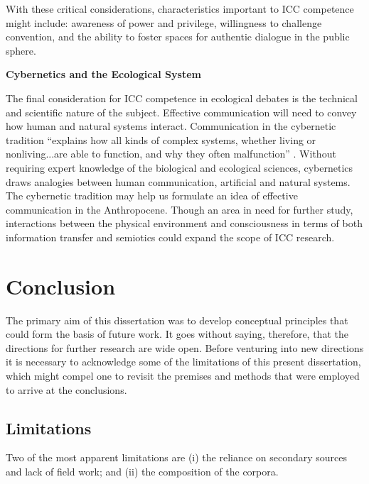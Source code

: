 With these critical considerations, characteristics important to ICC competence might include: awareness of power and privilege, willingness to challenge convention, and the ability to foster spaces for authentic dialogue in the public sphere. 

\textbf{Cybernetics and the Ecological System}

The final consideration for ICC competence in ecological debates is the technical and scientific nature of the subject. Effective communication will need to convey how human and natural systems interact. Communication in the cybernetic tradition ``explains how all kinds of complex systems, whether living or nonliving...are able to function, and why they often malfunction'' \cite[141]{Craig1999a}. Without requiring expert knowledge of the biological and ecological sciences, cybernetics draws analogies between human communication, artificial and natural systems. The cybernetic tradition may help us formulate an idea of effective communication in the Anthropocene. Though an area in need for further study, interactions between the physical environment and consciousness in terms of both information transfer and semiotics could expand the scope of ICC research.     


\section{Conclusion}

The primary aim of this dissertation was to develop conceptual principles that could form the basis of future work. It goes without saying, therefore, that the directions for further research are wide open. Before venturing into new directions it is necessary to acknowledge some of the limitations of this present dissertation, which might compel one to revisit the premises and methods that were employed to arrive at the conclusions. 

\subsection{Limitations}

Two of the most apparent limitations are (i) the reliance on secondary sources and lack of field work; and (ii) the composition of the corpora. 

